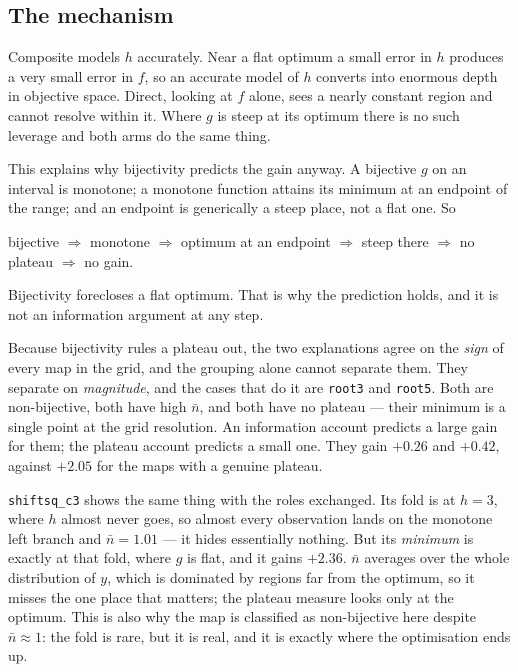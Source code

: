 \documentclass[11pt]{article}
\begin{document}
\subsection{The mechanism}

Composite models $h$ accurately. Near a flat optimum a small error in $h$
produces a very small error in $f$, so an accurate model of $h$ converts into
enormous depth in objective space. Direct, looking at $f$ alone, sees a nearly
constant region and cannot resolve within it. Where $g$ is steep at its
optimum there is no such leverage and both arms do the same thing.

This explains why bijectivity predicts the gain anyway. A bijective $g$ on an
interval is monotone; a monotone function attains its minimum at an endpoint
of the range; and an endpoint is generically a steep place, not a flat one. So

\begin{center}
bijective $\Rightarrow$ monotone $\Rightarrow$ optimum at an endpoint
$\Rightarrow$ steep there $\Rightarrow$ no plateau $\Rightarrow$ no gain.
\end{center}

\noindent Bijectivity forecloses a flat optimum. That is why the prediction
holds, and it is not an information argument at any step.

Because bijectivity rules a plateau out, the two explanations agree on the
\emph{sign} of every map in the grid, and the grouping alone cannot separate
them. They separate on \emph{magnitude}, and the cases that do it are
\texttt{root3} and \texttt{root5}. Both are non-bijective, both have high
$\bar n$, and both have no plateau --- their minimum is a single point at the
grid resolution. An information account predicts a large gain for them; the
plateau account predicts a small one. They gain $+0.26$ and $+0.42$, against
$+2.05$ for the maps with a genuine plateau.

\texttt{shiftsq\_c3} shows the same thing with the roles exchanged. Its fold
is at $h=3$, where $h$ almost never goes, so almost every observation lands
on the monotone left branch and $\bar n=1.01$ --- it hides essentially
nothing. But its \emph{minimum} is exactly at that fold, where $g$ is flat,
and it gains $+2.36$. $\bar n$ averages over the whole distribution of $y$,
which is dominated by regions far from the optimum, so it misses the one
place that matters; the plateau measure looks only at the optimum. This is
also why the map is classified as non-bijective here despite $\bar n\approx1$:
the fold is rare, but it is real, and it is exactly where the optimisation
ends up.
\end{document}
